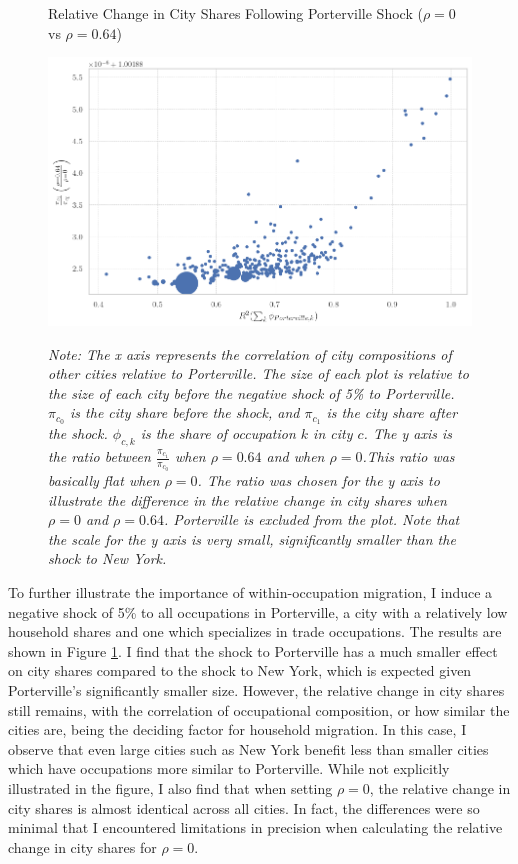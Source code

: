 \documentclass[10pt]{article}
\begin{document}
\begin{figure}[!htb]
    \centering
    \caption{Relative Change in City Shares Following Porterville Shock ($\rho = 0$ vs $\rho = 0.64$)}
    \includegraphics[width=\textwidth]{../../estimations/graphs/city_shock_s.png}
    \label{vp_change_graph}
    \caption*{\small\textit{Note: The x axis represents the correlation of city compositions of other cities relative to Porterville. The size of each plot is relative to the size of each city before the negative shock of 5\% to Porterville. $\pi_{c_0}$ is the city share before the shock, and $\pi_{c_1}$ is the city share after the shock. $\phi_{c, k}$ is the share of occupation $k$ in city $c$. The y axis is the ratio between $\frac{\pi_{c_1}}{\pi_{c_0}}$ when $\rho = 0.64$ and when $\rho = 0$.This ratio was basically flat when $\rho = 0$. The ratio was chosen for the y axis to illustrate the difference in the relative change in city shares when $\rho = 0$ and $\rho = 0.64$. Porterville is excluded from the plot. Note that the scale for the y axis is very small, significantly smaller than the shock to New York.}}
\end{figure}

To further illustrate the importance of within-occupation migration, I induce a negative shock of 5\% to all occupations in Porterville, a city with a relatively low household shares and one which specializes in trade occupations. The results are shown in Figure \ref{vp_change_graph}. I find that the shock to Porterville has a much smaller effect on city shares compared to the shock to New York, which is expected given Porterville's significantly smaller size. However, the relative change in city shares still remains, with the correlation of occupational composition, or how similar the cities are, being the deciding factor for household migration. In this case, I observe that even large cities such as New York benefit less than smaller cities which have occupations more similar to Porterville. While not explicitly illustrated in the figure, I also find that when setting $\rho = 0$, the relative change in city shares is almost identical across all cities. In fact, the differences were so minimal that I encountered limitations in precision when calculating the relative change in city shares for $\rho = 0$.
\end{document}
